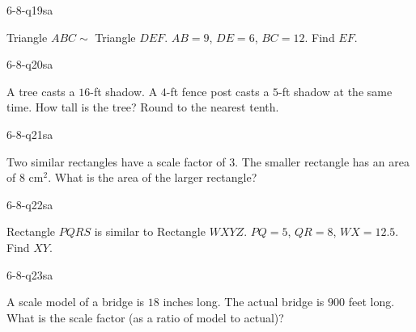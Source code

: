 
\begin{practiceQuestion}{6-8-q19}{sa}
\begin{questionText}
Triangle $ABC \sim$ Triangle $DEF$. $AB = 9$, $DE = 6$, $BC = 12$. Find $EF$.
\end{questionText}
\end{practiceQuestion}

\begin{practiceQuestion}{6-8-q20}{sa}
\begin{questionText}
A tree casts a $16$-ft shadow. A $4$-ft fence post casts a $5$-ft shadow at the same time. How tall is the tree? Round to the nearest tenth.
\end{questionText}
\end{practiceQuestion}

\begin{practiceQuestion}{6-8-q21}{sa}
\begin{questionText}
Two similar rectangles have a scale factor of $3$. The smaller rectangle has an area of $8$ cm$^2$. What is the area of the larger rectangle?
\end{questionText}
\end{practiceQuestion}

\begin{practiceQuestion}{6-8-q22}{sa}
\begin{questionText}
Rectangle $PQRS$ is similar to Rectangle $WXYZ$. $PQ = 5$, $QR = 8$, $WX = 12.5$. Find $XY$.
\end{questionText}
\end{practiceQuestion}

\begin{practiceQuestion}{6-8-q23}{sa}
\begin{questionText}
A scale model of a bridge is $18$ inches long. The actual bridge is $900$ feet long. What is the scale factor (as a ratio of model to actual)?
\end{questionText}
\end{practiceQuestion}

